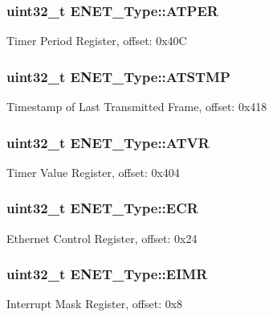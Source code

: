 \subsubsection[{\texorpdfstring{A\+T\+P\+ER}{ATPER}}]{ uint32\+\_\+t E\+N\+E\+T\+\_\+\+Type\+::\+A\+T\+P\+ER}\hypertarget{structENET__Type_a9620a4a827db2cfd586c226a7174fabe}{}\label{structENET__Type_a9620a4a827db2cfd586c226a7174fabe}
Timer Period Register, offset\+: 0x40C 
\subsubsection[{\texorpdfstring{A\+T\+S\+T\+MP}{ATSTMP}}]{ uint32\+\_\+t E\+N\+E\+T\+\_\+\+Type\+::\+A\+T\+S\+T\+MP}\hypertarget{structENET__Type_a5d9cdc2cd314ee0d995cdf374744af6d}{}\label{structENET__Type_a5d9cdc2cd314ee0d995cdf374744af6d}
Timestamp of Last Transmitted Frame, offset\+: 0x418 
\subsubsection[{\texorpdfstring{A\+T\+VR}{ATVR}}]{ uint32\+\_\+t E\+N\+E\+T\+\_\+\+Type\+::\+A\+T\+VR}\hypertarget{structENET__Type_a3e96f893dbd384b9469847bf08c22e88}{}\label{structENET__Type_a3e96f893dbd384b9469847bf08c22e88}
Timer Value Register, offset\+: 0x404 
\subsubsection[{\texorpdfstring{E\+CR}{ECR}}]{ uint32\+\_\+t E\+N\+E\+T\+\_\+\+Type\+::\+E\+CR}\hypertarget{structENET__Type_a0280ca4dba07c6a76901229ce4c885da}{}\label{structENET__Type_a0280ca4dba07c6a76901229ce4c885da}
Ethernet Control Register, offset\+: 0x24 
\subsubsection[{\texorpdfstring{E\+I\+MR}{EIMR}}]{ uint32\+\_\+t E\+N\+E\+T\+\_\+\+Type\+::\+E\+I\+MR}\hypertarget{structENET__Type_ac8ca6627a6219451b62a04a55177367b}{}\label{structENET__Type_ac8ca6627a6219451b62a04a55177367b}
Interrupt Mask Register, offset\+: 0x8 
